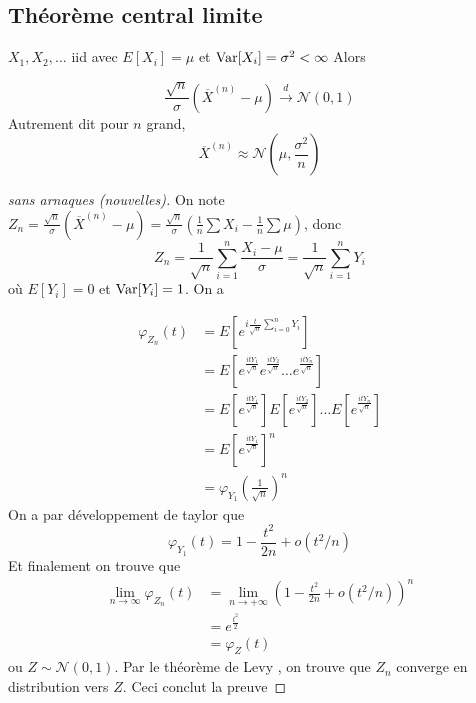 \subsection{Théorème central limite}
\begin{theoreme}
    $X_1,X_2,...$ iid avec $E[X_i]= \mu$ et $\operatorname{Var}[X_i]= \sigma^2 < \infty$ Alors

    \[
    \frac{\sqrt{n}}{\sigma}(\overline{X}^{(n)}- \mu) \overset{d}{\longrightarrow} \mathcal{N}(0,1)
    \]
    Autrement dit pour $n$ grand,
    \[\overline{X}^{(n)}\approx \mathcal{N}(\mu, \frac{\sigma^2}{n}) \]
\end{theoreme}

\begin{proof}[sans arnaques (nouvelles)]
    On note $Z_n= \frac{\sqrt{n}}{\sigma}(\overline{X}^{(n)}-\mu)=\frac{\sqrt{n}}{\sigma}(\frac{1}{n}\sum X_i-\frac 1 n \sum \mu)$, donc 
    \[
    Z_n=\frac 1 {\sqrt{n}}  \sum_{i=1}^n \frac{X_i- \mu}{\sigma}=  \frac 1 {\sqrt{n}}  \sum_{i=1}^n Y_i
    \]
    où $E[Y_i]= 0$ et $\operatorname{Var} [Y_i]= 1$. On a 

\begin{align*}
    \varphi_{Z_n}(t)&= E\left[e^{i\frac{t}{\sqrt n}\sum_{i=0}^n Y_i}\right]\\
    &=E\left[e^{\frac{itY_1}{\sqrt{n}}}e^{\frac{itY_2}{\sqrt{n}}}\dots e^{\frac{itY_n}{\sqrt{n}}}\right]\\
    &=E\left[e^{\frac{itY_1}{\sqrt{n}}}\right ] E\left[e^{\frac{itY_2}{\sqrt{n}}}\right] \dots E\left[e^{\frac{itY_n}{\sqrt{n}}}\right]\\
    &=E\left[e^{\frac{itY_1}{\sqrt{n}}}\right]^n\\
    &=\varphi_{Y_1}\left(\frac{1}{\sqrt{n}}\right)^n
\end{align*}
    On a par développement de taylor que $$ \varphi_{Y_1}(t)= 1 - \frac{t^2}{2n} + o(t^2/n)$$
    Et finalement on trouve que \begin{align*}
        \lim_{n\to \infty}\varphi_{Z_n}(t)&=\lim_{n\to +\infty}\left(1 - \frac{t^2}{2n} + o(t^2/n)\right)^n\\
        &=e^{\frac{t^2}{2}}\\
        &=\varphi_Z(t)
    \end{align*}
    ou $Z\sim \mathcal{N}(0,1)$. Par le théorème de Levy , on trouve que $Z_n$ converge en distribution vers $Z$. Ceci conclut la preuve
\end{proof}
